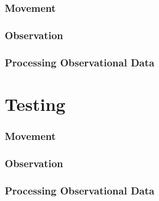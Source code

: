 		\subsection{Movement}
		\subsection{Observation}
		\subsection{Processing Observational Data}
		
	\chapter{Testing}
		\subsection{Movement}
		\subsection{Observation}
		\subsection{Processing Observational Data}